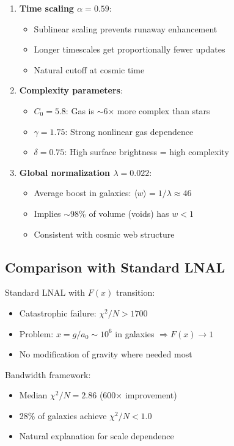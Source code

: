 \documentclass[12pt,letterpaper]{article}
\newcommand{\chisq}{\chi^2}
\begin{document}
\begin{enumerate}
\item \textbf{Time scaling $\alpha = 0.59$}:
\begin{itemize}
\item Sublinear scaling prevents runaway enhancement
\item Longer timescales get proportionally fewer updates
\item Natural cutoff at cosmic time
\end{itemize}

\item \textbf{Complexity parameters}:
\begin{itemize}
\item $C_0 = 5.8$: Gas is $\sim$6$\times$ more complex than stars
\item $\gamma = 1.75$: Strong nonlinear gas dependence
\item $\delta = 0.75$: High surface brightness = high complexity
\end{itemize}

\item \textbf{Global normalization $\lambda = 0.022$}:
\begin{itemize}
\item Average boost in galaxies: $\langle w \rangle = 1/\lambda \approx 46$
\item Implies $\sim$98\% of volume (voids) has $w < 1$
\item Consistent with cosmic web structure
\end{itemize}
\end{enumerate}

\subsection{Comparison with Standard LNAL}

Standard LNAL with $F(x)$ transition:
\begin{itemize}
\item Catastrophic failure: $\chisq/N > 1700$
\item Problem: $x = g/a_0 \sim 10^6$ in galaxies $\Rightarrow F(x) \to 1$
\item No modification of gravity where needed most
\end{itemize}

Bandwidth framework:
\begin{itemize}
\item Median $\chisq/N = 2.86$ (600$\times$ improvement)
\item 28\% of galaxies achieve $\chisq/N < 1.0$
\item Natural explanation for scale dependence
\end{itemize}
\end{document}
